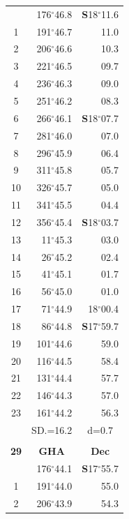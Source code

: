 \documentclass[10pt, a4paper]{report}
\begin{document}
\begin{scriptsize}
\begin{tabular*}{0.2\textwidth}[t]{@{\extracolsep{\fill}}|c|rr|}
\hline\rule{0pt}{2.6ex}\noindent
0 & 176$^\circ$46.8 & \textbf{S}18$^\circ$11.6\\
1 & 191$^\circ$46.7 & 11.0\\
2 & 206$^\circ$46.6 & 10.3\\
3 & 221$^\circ$46.5 & \raisebox{0.24ex}{\boldmath$\cdot$~\boldmath$\cdot$~~}09.7\\
4 & 236$^\circ$46.3 & 09.0\\
5 & 251$^\circ$46.2 & 08.3\\[2Pt]
6 & 266$^\circ$46.1 & \textbf{S}18$^\circ$07.7\\
7 & 281$^\circ$46.0 & 07.0\\
8 & 296$^\circ$45.9 & 06.4\\
9 & 311$^\circ$45.8 & \raisebox{0.24ex}{\boldmath$\cdot$~\boldmath$\cdot$~~}05.7\\
10 & 326$^\circ$45.7 & 05.0\\
11 & 341$^\circ$45.5 & 04.4\\[2Pt]
12 & 356$^\circ$45.4 & \textbf{S}18$^\circ$03.7\\
13 & 11$^\circ$45.3 & 03.0\\
14 & 26$^\circ$45.2 & 02.4\\
15 & 41$^\circ$45.1 & \raisebox{0.24ex}{\boldmath$\cdot$~\boldmath$\cdot$~~}01.7\\
16 & 56$^\circ$45.0 & 01.0\\
17 & 71$^\circ$44.9 & 18$^\circ$00.4\\[2Pt]
18 & 86$^\circ$44.8 & \textbf{S}17$^\circ$59.7\\
19 & 101$^\circ$44.6 & 59.0\\
20 & 116$^\circ$44.5 & 58.4\\
21 & 131$^\circ$44.4 & \raisebox{0.24ex}{\boldmath$\cdot$~\boldmath$\cdot$~~}57.7\\
22 & 146$^\circ$44.3 & 57.0\\
23 & 161$^\circ$44.2 & 56.3\\
\hline
\rule{0pt}{2.4ex} & \multicolumn{1}{c}{SD.=16.2} & \multicolumn{1}{c|}{d=0.7}\\
\hline
\multicolumn{1}{c}{}\\[-0.5ex]\hline
\multicolumn{1}{|c|}{\rule{0pt}{2.6ex}\textbf{29}} & \multicolumn{1}{c}{\textbf{GHA}} & \multicolumn{1}{c|}{\textbf{Dec}}\\
\hline\rule{0pt}{2.6ex}\noindent
0 & 176$^\circ$44.1 & \textbf{S}17$^\circ$55.7\\
1 & 191$^\circ$44.0 & 55.0\\
2 & 206$^\circ$43.9 & 54.3\\

\end{tabular*}
\end{scriptsize}
\end{document}
